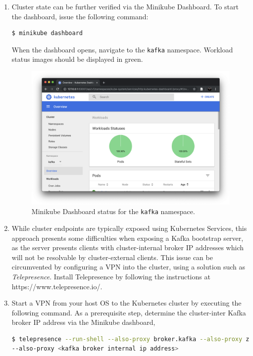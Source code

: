 \begin{enumerate}
 \item Cluster state can be further verified via the Minikube Dashboard. To start the dashboard, issue the following command:
 
 \begin{lstlisting}[language=bash]
 $ minikube dashboard
 \end{lstlisting}
 
 When the dashboard opens, navigate to the \texttt{kafka} namespace. Workload status images should be displayed in green. 
 
 \begin{figure}[H]
 	\centering  
 	\includegraphics[width=\linewidth]{figures/appendixA/dashboard-kafka.png}
 	\caption{Minikube Dashboard status for the \texttt{kafka} namespace.}
 \end{figure}

 \item While cluster endpoints are typically exposed using Kubernetes Services, this approach presents some difficulties when exposing a Kafka bootstrap server, as the server presents clients with cluster-internal broker IP addresses which will not be resolvable by cluster-external clients. This issue can be circumvented by configuring a VPN into the cluster, using a solution such as \textit{Telepresence}. Install Telepresence by following the instructions at https://www.telepresence.io/.
 
 \item Start a VPN from your host OS to the Kubernetes cluster by executing the following command. As a prerequisite step, determine the cluster-inter Kafka broker IP address via the Minikube dashboard,
 
 \begin{lstlisting}[language=bash]
$ telepresence --run-shell --also-proxy broker.kafka --also-proxy zookeeper.kafka  
--also-proxy <kafka broker internal ip address>
\end{lstlisting}


\end{enumerate}
